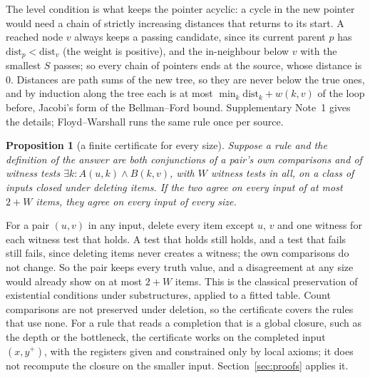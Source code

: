 \documentclass[10pt]{article}
\newtheorem{proposition}{Proposition}
\begin{document}
The level condition is what keeps the pointer acyclic: a cycle in the new pointer would need a chain of strictly
increasing distances that returns to its start. A reached node $v$ always keeps a passing candidate, since its current
parent $p$ has $\mathrm{dist}_p < \mathrm{dist}_v$ (the weight is positive), and the in-neighbour below $v$ with the
smallest $S$ passes; so every chain of pointers ends at the source, whose distance is $0$. Distances are path sums of the
new tree, so they are never below the true ones, and by induction along the tree each is at most
$\min_k \mathrm{dist}_k + w(k,v)$ of the loop before, Jacobi's form of the Bellman--Ford bound\cite{bellman1958routing}.
Supplementary Note~1 gives the details; Floyd--Warshall runs the same rule once per source.

\begin{proposition}[a finite certificate for every size]\label{prop:finite}
Suppose a rule and the definition of the answer are both conjunctions of a pair's own comparisons and of witness tests
$\exists k : A(u,k) \wedge B(k,v)$, with $W$ witness tests in all, on a class of inputs closed under deleting items.
If the two agree on every input of at most $2 + W$ items, they agree on every input of every size.
\end{proposition}

For a pair $(u,v)$ in any input, delete every item except $u$, $v$ and one witness for each witness test that holds. A
test that holds still holds, and a test that fails still fails, since deleting items never creates a witness; the own
comparisons do not change. So the pair keeps every truth value, and a disagreement at any size would already show on
at most $2 + W$ items. This is the classical preservation of existential conditions under substructures, applied to a fitted table. Count
comparisons are not preserved under deletion, so the certificate covers the rules that use none. For a rule that reads a
completion that is a global closure, such as the depth or the bottleneck, the certificate works on the completed input
$(x, y^{+})$, with the registers given and constrained only by local axioms; it does not recompute the closure on the
smaller input. Section~\ref{sec:proofs} applies it.
\end{document}
